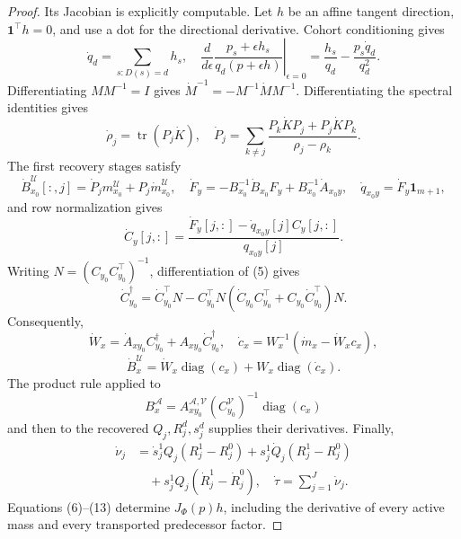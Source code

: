 \documentclass{article}
\begin{document}
\begin{proof}
Its Jacobian is explicitly computable.  Let \(h\) be an affine tangent direction, \(\mathbf1^\top h=0\), and use a dot for the directional derivative.  Cohort conditioning gives
\[
 \dot q_d=\sum_{s:D(s)=d}h_s,
 \quad
 \left.\frac{d}{d\epsilon}
 \frac{p_s+\epsilon h_s}{q_d(p+\epsilon h)}\right|_{\epsilon=0}
 =\frac{h_s}{q_d}-\frac{p_s\dot q_d}{q_d^2}.
\tag{6}
\]
Differentiating \(MM^{-1}=I\) gives \(\dot M^{-1}=-M^{-1}\dot M M^{-1}\).  Differentiating the spectral identities gives
\[
 \dot\rho_j=\operatorname{tr}(P_j\dot K),
 \quad
 \dot P_j=\sum_{k\ne j}
 \frac{P_k\dot K P_j+P_j\dot K P_k}{\rho_j-\rho_k}.
\tag{7}
\]
The first recovery stages satisfy
\[
 \dot B_{x_0}^{\mathcal U}[:,j]
 =\dot P_jm_{x_0}^{\mathcal U}+P_j\dot m_{x_0}^{\mathcal U},
 \quad
 \dot F_y=-B_{x_0}^{-1}\dot B_{x_0}F_y+B_{x_0}^{-1}\dot A_{x_0y},
 \quad
 \dot q_{x_0y}=\dot F_y\mathbf1_{m+1},
\tag{8}
\]
and row normalization gives
\[
 \dot C_y[j,:]
 =\frac{\dot F_y[j,:]-\dot q_{x_0y}[j]C_y[j,:]}{q_{x_0y}[j]}.
\tag{9}
\]
Writing \(N=(C_{y_0}C_{y_0}^\top)^{-1}\), differentiation of (5) gives
\[
 \dot C_{y_0}^\dagger
 =\dot C_{y_0}^\top N-C_{y_0}^\top N
 (\dot C_{y_0}C_{y_0}^\top+C_{y_0}\dot C_{y_0}^\top)N.
\tag{10}
\]
Consequently,
\[
 \dot W_x=\dot A_{xy_0}C_{y_0}^\dagger+A_{xy_0}\dot C_{y_0}^\dagger,
 \quad
 \dot c_x=W_x^{-1}(\dot m_x-\dot W_xc_x),
\tag{11}
\]
\[
 \dot B_x^{\mathcal U}
 =\dot W_x\operatorname{diag}(c_x)+W_x\operatorname{diag}(\dot c_x).
\tag{12}
\]
The product rule applied to
\[
 B_x^{\mathcal A}=A_{xy_0}^{\mathcal A,\mathcal V}
 (C_{y_0}^{\mathcal V})^{-1}\operatorname{diag}(c_x)
\]
and then to the recovered \(Q_j,R_j^d,s_j^d\) supplies their derivatives.  Finally,
\[
\begin{aligned}
 \dot\nu_j
 &=\dot s_j^1Q_j(R_j^1-R_j^0)+s_j^1\dot Q_j(R_j^1-R_j^0)\\
 &\quad+s_j^1Q_j(\dot R_j^1-\dot R_j^0),
 \quad
 \dot\tau=\sum_{j=1}^J\dot\nu_j.
\end{aligned}
\tag{13}
\]
Equations (6)--(13) determine \(J_\Phi(p)h\), including the derivative of every active mass and every transported predecessor factor.


\end{proof}
\end{document}
